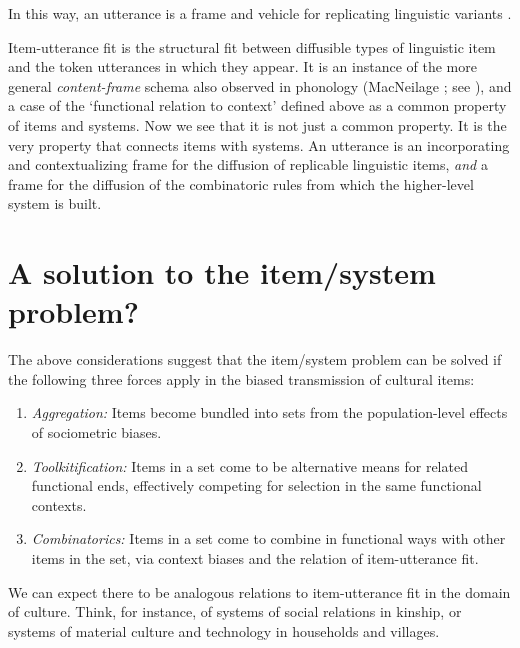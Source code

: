 In this way, an utterance is a frame and vehicle for replicating linguistic variants \citep{croft_explaining_2000}. 



Item-utterance fit is the structural fit between diffusible types of 
linguistic item and the token utterances in which they appear. It is an 
instance of the more general \textit{content-frame} schema \citep{levelt_speaking:_1989} also 
observed in phonology (MacNeilage \citeyear{macneilage_frame/content_1998}; see \citealt[54-55]{enfield_relationship_2013}), and a 
case of the \textquoteleft functional relation to context' defined above as a common property of items and systems. Now we see that it is not just a 
common property. It is the very property that connects items with systems. An utterance is an incorporating and contextualizing 
frame for the diffusion of replicable linguistic items, \textit{and} a frame for the diffusion of the combinatoric rules from which the 
higher-level system is built. 



\section{A solution to the item/system problem?}


The above considerations suggest that the item/system problem can be 
solved if the following three forces apply in the 
biased transmission of cultural items: 

\begin{enumerate}

\item {\textit{Aggregation:} Items become bundled into sets
from the population-level effects of sociometric biases.}
 
\item {\textit{Toolkitification:} Items in a set come to be alternative means for related functional ends, effectively competing for selection in the same functional contexts.}
 \item {\textit{Combinatorics:} Items in a set come to combine in functional ways with other items in the set, via context biases and the relation 
of item-utterance fit.} 

\end{enumerate}

We can expect there to be analogous relations to 
item-utterance fit in the domain of culture. Think, for instance, of 
systems of social relations in kinship, or systems of material culture 
and technology in households and villages. 



